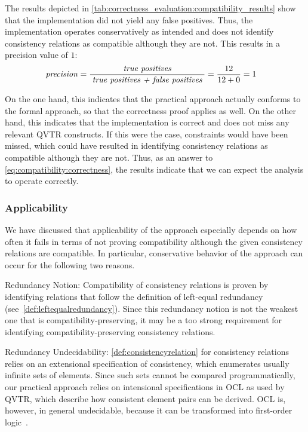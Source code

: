 The results depicted in \autoref{tab:correctness_evaluation:compatibility_results} show that the implementation did not yield any false positives.
Thus, the implementation operates conservatively as intended and does not identify consistency relations as compatible although they are not.
This results in a precision value of $1$:
\begin{align*}
    &
    \mathit{precision} = \frac{\; \textit{true positives} \;}{\; \textit{true positives + false positives} \;} = \frac{12}{12+0} = 1
\end{align*}

On the one hand, this indicates that the practical approach actually conforms to the formal approach, so that the correctness proof applies as well.
On the other hand, this indicates that the implementation is correct and does not miss any relevant \gls{QVTR} constructs.
If this were the case, constraints would have been missed, which could have resulted in identifying consistency relations as compatible although they are not.
Thus, as an answer to \autoref{eq:compatibility:correctness}, the results indicate that we can expect the analysis to operate correctly.


\subsubsection{Applicability}

We have discussed that applicability of the approach especially depends on how often it fails in terms of not proving compatibility although the given consistency relations are compatible.
In particular, conservative behavior of the approach can occur for the following two reasons.
\begin{properdescription}
    \item[Redundancy Notion:] Compatibility of consistency relations is proven by identifying relations that follow the definition of left-equal redundancy (see~\autoref{def:leftequalredundancy}). Since this redundancy notion is not the weakest one that is compatibility-preserving, it may be a too strong requirement for identifying compatibility-preserving consistency relations.
    \item[Redundancy Undecidability:] \autoref{def:consistencyrelation} for consistency relations relies on an extensional specification of consistency, which enumerates usually infinite sets of elements.
    Since such sets cannot be compared programmatically, our practical approach relies on intensional specifications in \gls{OCL} as used by \gls{QVTR}, which describe how consistent element pairs can be derived.
    \gls{OCL} is, however, in general undecidable, because it can be transformed into first-order logic~\cite{beckert2002ocltranslation}.
\end{properdescription}

